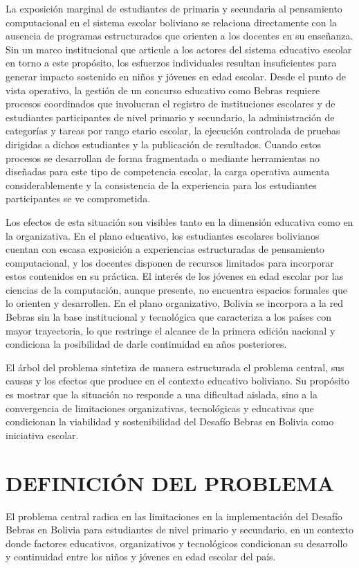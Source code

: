 La exposición marginal de estudiantes de primaria y secundaria al pensamiento computacional en el sistema escolar boliviano se relaciona directamente con la ausencia de programas estructurados que orienten a los docentes en su enseñanza. Sin un marco institucional que articule a los actores del sistema educativo escolar en torno a este propósito, los esfuerzos individuales resultan insuficientes para generar impacto sostenido en niños y jóvenes en edad escolar. Desde el punto de vista operativo, la gestión de un concurso educativo como Bebras requiere procesos coordinados que involucran el registro de instituciones escolares y de estudiantes participantes de nivel primario y secundario, la administración de categorías y tareas por rango etario escolar, la ejecución controlada de pruebas dirigidas a dichos estudiantes y la publicación de resultados. Cuando estos procesos se desarrollan de forma fragmentada o mediante herramientas no diseñadas para este tipo de competencia escolar, la carga operativa aumenta considerablemente y la consistencia de la experiencia para los estudiantes participantes se ve comprometida.

Los efectos de esta situación son visibles tanto en la dimensión educativa como en la organizativa. En el plano educativo, los estudiantes escolares bolivianos cuentan con escasa exposición a experiencias estructuradas de pensamiento computacional, y los docentes disponen de recursos limitados para incorporar estos contenidos en su práctica. El interés de los jóvenes en edad escolar por las ciencias de la computación, aunque presente, no encuentra espacios formales 
que lo orienten y desarrollen. En el plano organizativo, Bolivia se incorpora a la red Bebras sin la base institucional y tecnológica que caracteriza a los países con mayor trayectoria, lo que restringe el alcance de la primera edición nacional 
y condiciona la posibilidad de darle continuidad en años posteriores.

El árbol del problema sintetiza de manera estructurada el problema central, sus causas y los efectos que produce en el contexto educativo boliviano. Su propósito es mostrar que la situación no responde a una dificultad aislada, sino a la 
convergencia de limitaciones organizativas, tecnológicas y educativas que condicionan la viabilidad y sostenibilidad del Desafío Bebras en Bolivia como iniciativa escolar.



\section{DEFINICIÓN DEL PROBLEMA}

El problema central radica en las limitaciones en la implementación del Desafío Bebras en Bolivia para estudiantes de nivel primario y secundario, en un contexto donde factores educativos, organizativos y tecnológicos condicionan su desarrollo y continuidad entre los niños y jóvenes en edad escolar del país.